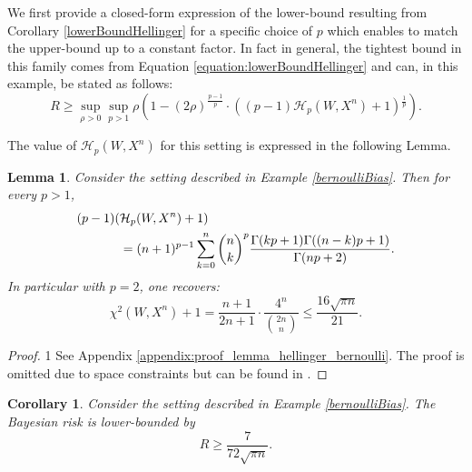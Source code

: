 \documentclass[conference]{IEEEtran}
\theoremstyle{plain}
\newtheorem{lemma}{Lemma}
\newtheorem{corollary}{Corollary}
\theoremstyle{definition}
\theoremstyle{remark}
\def\arxiv{1}
\begin{document}
We first provide a closed-form expression of the lower-bound resulting from Corollary \ref{lowerBoundHellinger} for a specific choice of $p$ which enables to match the upper-bound up to a constant factor. In fact in general, the tightest bound in this family comes from Equation \eqref{equation:lowerBoundHellinger} and can, in this example, be stated as follows:
\begin{equation}\label{equation:lower_bound_hellinger_bernoulli}
    R \geq \sup_{\rho > 0} \sup_{p > 1}\rho\!\left(\!1- (2\rho)^{\frac{p-1}{p}}\!\!\cdot  \left((p-1) \mathcal{H}_p(W,X^n) + 1\right)\! ^\frac{1}{p}\! \right).
\end{equation}

The value of $\mathcal{H}_p(W,X^n)$ for this setting is expressed in the following Lemma. \begin{lemma}\label{lemma:hellinger_bernoulli}
Consider the setting described in Example \ref{bernoulliBias}. Then for every $p>1$,
\begin{align}
    (p-1)(&\mathcal{H}_p(W,X^n)+1) \notag\\&= (n+1)^{p-1}\sum_{k=0}^n \binom{n}{k}^p\frac{\Gamma(kp+1)\Gamma((n-k)p+1)}{\Gamma(np+2)}.
\end{align}
In particular with $p=2$, one recovers:
\begin{equation}
    \chi^2(W,X^n)+1 = \frac{n+1}{2n+1}\cdot \frac{4^n}{\binom{2n}{n}}\leq \frac{16\sqrt{\pi n}}{21}. \label{H2Bernoulli}
\end{equation}
\end{lemma}
\begin{proof}
\if\arxiv1
    See Appendix \ref{appendix:proof_lemma_hellinger_bernoulli}.
\else 
    The proof is omitted due to space constraints but can be found in \cite[Appendix B]{arxiv_version_of_this_paper}.
\fi
\end{proof}
\begin{corollary}\label{corollary:bernoulli_lower_bound_closed_form}
Consider the setting described in Example \ref{bernoulliBias}. The Bayesian risk is lower-bounded by
\begin{equation}\label{equation:bernoulli_lower_bound_closed_form}
    R \geq \frac{7}{72\sqrt{\pi n}}.
\end{equation}
\end{corollary}
\end{document}

